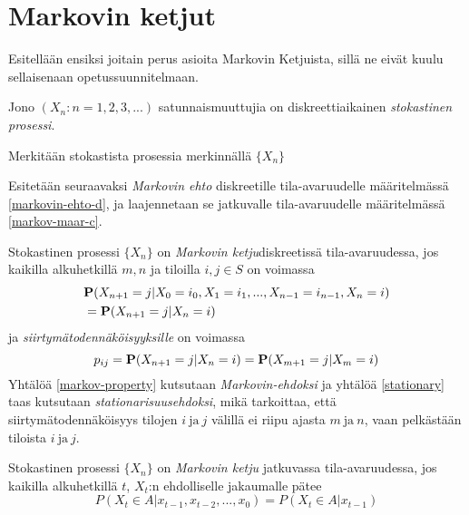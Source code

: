 
\section{Markovin ketjut}

Esitellään ensiksi joitain perus asioita Markovin Ketjuista, sillä ne eivät kuulu sellaisenaan opetussuunnitelmaan. \cite{piiroinen_stokastiset_nodate}

\begin{maar}
	Jono $(X_n:n=1,2,3,...)$ satunnaismuuttujia on diskreettiaikainen \textit{stokastinen prosessi}.
\end{maar}

\begin{merk}
	Merkitään stokastista prosessia merkinnällä $\{ X_n \}$
\end{merk}

Esitetään seuraavaksi \textit{Markovin ehto} diskreetille tila-avaruudelle määritelmässä \ref{markovin-ehto-d}, ja laajennetaan se jatkuvalle tila-avaruudelle määritelmässä \ref{markov-maar-c}.

\begin{maar}\label{markovin-ehto-d}
	Stokastinen prosessi $\{X_n\}$ on \textit{Markovin ketju}diskreetissä tila-avaruudessa, jos kaikilla alkuhetkillä $m,n$ ja tiloilla $i,j\in S$ on voimassa
	\begin{equation}\label{markov-property}
		\begin{split}
			&\textbf{P}(X_{n+1}=j|X_0=i_0,X_1=i_1,...,X_{n-1}=i_{n-1},X_n=i) \\
		 &= \textbf{P}(X_{n+1}=j|X_n=i) 
		\end{split}
	\end{equation}
	ja \textit{siirtymätodennäköisyyksille} on voimassa 
	\begin{equation}\label{stationary}
		p_{ij}=\textbf{P}(X_{n+1}=j|X_n=i)=\textbf{P}(X_{m+1}=j|X_m=i)
	\end{equation}
	Yhtälöä \ref{markov-property} kutsutaan \textit{Markovin-ehdoksi} ja yhtälöä \ref{stationary} taas kutsutaan \textit{stationarisuusehdoksi}, mikä tarkoittaa, 
	että siirtymätodennäköisyys tilojen $i\ \text{ja}\ j$ välillä ei riipu ajasta $m\ \text{ja}\ n$, vaan pelkästään tiloista $i\ \text{ja}\ j$.
\end{maar}

\begin{maar}\label{markov-maar-c}
	Stokastinen prosessi $\{X_n\}$ on \textit{Markovin ketju} jatkuvassa tila-avaruudessa, jos kaikilla alkuhetkillä $t$, $X_t$:n ehdolliselle jakaumalle pätee
	\begin{equation}
		P(X_t\in A | x_{t-1},x_{t-2},...,x_0) = 	P(X_t\in A | x_{t-1})
	\end{equation}
\end{maar}

